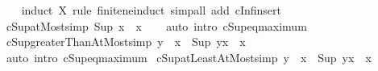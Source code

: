 \begin{isabellebody}
%
\isadelimproof
\ \ %
\endisadelimproof
%
\isatagproof
{}\isamarkupfalse%
\ {\isacharparenleft}{\kern0pt}induct\ X\ rule{\isacharcolon}{\kern0pt}\ finite{\isacharunderscore}{\kern0pt}ne{\isacharunderscore}{\kern0pt}induct{\isacharparenright}{\kern0pt}\ {\isacharparenleft}{\kern0pt}simp{\isacharunderscore}{\kern0pt}all\ add{\isacharcolon}{\kern0pt}\ cInf{\isacharunderscore}{\kern0pt}insert{\isacharparenright}{\kern0pt}%
\endisatagproof
{\isafoldproof}%
%
\isadelimproof
\isanewline
%
\endisadelimproof
\isanewline
{}\isamarkupfalse%
\ cSup{\isacharunderscore}{\kern0pt}atMost{\isacharbrackleft}{\kern0pt}simp{\isacharbrackright}{\kern0pt}{\isacharcolon}{\kern0pt}\ {\isachardoublequoteopen}Sup\ {\isacharbraceleft}{\kern0pt}{\isachardot}{\kern0pt}{\isachardot}{\kern0pt}x{\isacharbraceright}{\kern0pt}\ {\isacharequal}{\kern0pt}\ x{\isachardoublequoteclose}\isanewline
%
\isadelimproof
\ \ %
\endisadelimproof
%
\isatagproof
{}\isamarkupfalse%
\ {\isacharparenleft}{\kern0pt}auto\ intro{\isacharbang}{\kern0pt}{\isacharcolon}{\kern0pt}\ cSup{\isacharunderscore}{\kern0pt}eq{\isacharunderscore}{\kern0pt}maximum{\isacharparenright}{\kern0pt}%
\endisatagproof
{\isafoldproof}%
%
\isadelimproof
\isanewline
%
\endisadelimproof
\isanewline
{}\isamarkupfalse%
\ cSup{\isacharunderscore}{\kern0pt}greaterThanAtMost{\isacharbrackleft}{\kern0pt}simp{\isacharbrackright}{\kern0pt}{\isacharcolon}{\kern0pt}\ {\isachardoublequoteopen}y\ {\isacharless}{\kern0pt}\ x\ {\isasymLongrightarrow}\ Sup\ {\isacharbraceleft}{\kern0pt}y{\isacharless}{\kern0pt}{\isachardot}{\kern0pt}{\isachardot}{\kern0pt}x{\isacharbraceright}{\kern0pt}\ {\isacharequal}{\kern0pt}\ x{\isachardoublequoteclose}\isanewline
%
\isadelimproof
\ \ %
\endisadelimproof
%
\isatagproof
{}\isamarkupfalse%
\ {\isacharparenleft}{\kern0pt}auto\ intro{\isacharbang}{\kern0pt}{\isacharcolon}{\kern0pt}\ cSup{\isacharunderscore}{\kern0pt}eq{\isacharunderscore}{\kern0pt}maximum{\isacharparenright}{\kern0pt}%
\endisatagproof
{\isafoldproof}%
%
\isadelimproof
\isanewline
%
\endisadelimproof
\isanewline
{}\isamarkupfalse%
\ cSup{\isacharunderscore}{\kern0pt}atLeastAtMost{\isacharbrackleft}{\kern0pt}simp{\isacharbrackright}{\kern0pt}{\isacharcolon}{\kern0pt}\ {\isachardoublequoteopen}y\ {\isasymle}\ x\ {\isasymLongrightarrow}\ Sup\ {\isacharbraceleft}{\kern0pt}y{\isachardot}{\kern0pt}{\isachardot}{\kern0pt}x{\isacharbraceright}{\kern0pt}\ {\isacharequal}{\kern0pt}\ x{\isachardoublequoteclose}\isanewline
%
\isadelimproof
\ \ %
\endisadelimproof
%
\isatagproof

\end{isabellebody}
